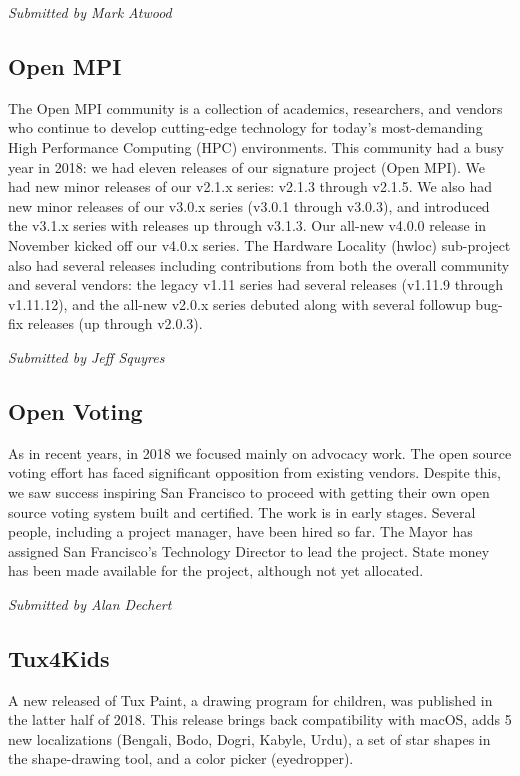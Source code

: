 \documentclass[a4paper]{report}
\begin{document}
{\em Submitted by Mark Atwood}

\subsection{Open MPI}

The Open MPI community is a collection of academics, researchers, and
vendors who continue to develop cutting-edge technology for today’s
most-demanding High Performance Computing (HPC) environments. This
community had a busy year in 2018: we had eleven releases of our
signature project (Open MPI).  We had new minor releases of our v2.1.x
series: v2.1.3 through v2.1.5.  We also had new minor releases of our
v3.0.x series (v3.0.1 through v3.0.3), and introduced the v3.1.x series
with releases up through v3.1.3.  Our all-new v4.0.0 release in November
kicked off our v4.0.x series.  The Hardware Locality (hwloc) sub-project
also had several releases including contributions from both the overall
community and several vendors: the legacy v1.11 series had several
releases (v1.11.9 through v1.11.12), and the all-new v2.0.x series
debuted along with several followup bug-fix releases (up through
v2.0.3).

{\em Submitted by Jeff Squyres}

\subsection{Open Voting}

As in recent years, in 2018 we focused mainly on advocacy work. The open
source voting effort has faced significant opposition from existing
vendors. Despite this, we saw success inspiring San Francisco to proceed
with getting their own open source voting system built and certified.
The work is in early stages. Several people, including a project
manager, have been hired so far. The Mayor has assigned San Francisco's
Technology Director to lead the project. State money has been made
available for the project, although not yet allocated.

{\em Submitted by Alan Dechert}

\subsection{Tux4Kids}

A new released of Tux Paint, a drawing program for children, was
published in the latter half of 2018.  This release brings back
compatibility with macOS, adds 5 new localizations (Bengali, Bodo,
Dogri, Kabyle, Urdu), a set of star shapes in the shape-drawing tool,
and a color picker (eyedropper).
\end{document}
